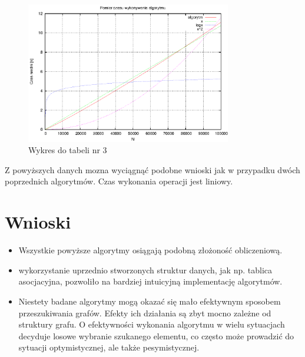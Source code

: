 \documentclass[a4paper,11pt]{article}
\begin{document}
\begin{enumerate}
    \begin{figure}[th]
\centering
\includegraphics[width=0.8\textwidth]{../prj/wykres15.eps}
\caption{Wykres do tabeli nr 3}
\label{Wykres do tabeli nr 3}
\end{figure} 
Z powyższych danych mozna wyciągnąć podobne wnioski jak w przypadku dwóch poprzednich algorytmów. Czas wykonania operacji jest liniowy.
\end{enumerate}

\section{Wnioski}

\begin{itemize}
\item Wszystkie powyższe algorytmy osiągają podobną złożoność obliczeniową.

\item wykorzystanie uprzednio stworzonych struktur danych, jak np. tablica asocjacyjna, pozwoliło na bardziej intuicyjną implementację algorytmów.

\item Niestety badane algorytmy mogą okazać się mało efektywnym sposobem przeszukiwania grafów. Efekty ich działania są zbyt mocno zależne od struktury grafu. O efektywności
wykonania algorytmu w wielu sytuacjach decyduje losowe wybranie szukanego elementu, co często może prowadzić do sytuacji optymistycznej, ale także pesymistycznej.
\end{itemize}
\end{document}

